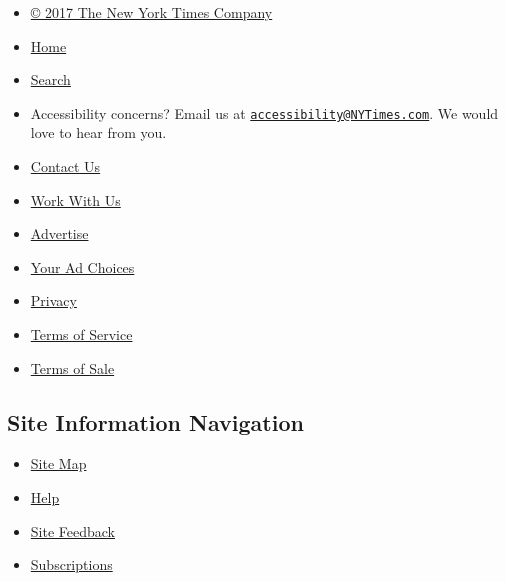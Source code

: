 \begin{itemize}
\tightlist
\item
  \href{https://www.nytimes3xbfgragh.onion/content/help/rights/copyright/copyright-notice.html}{©
  2017 The New York Times Company}
\item
  \href{https://www.nytimes3xbfgragh.onion}{Home}
\item
  \href{https://query.nytimes3xbfgragh.onion/search/sitesearch/\#/}{Search}
\item
  Accessibility concerns? Email us at
  \href{mailto:accessibility@NYTimes.com}{\nolinkurl{accessibility@NYTimes.com}}.
  We would love to hear from you.
\item
  \href{https://www.nytimes3xbfgragh.onion/ref/membercenter/help/infoservdirectory.html}{Contact
  Us}
\item
  \href{http://www.nytco.com/careers}{Work With Us}
\item
  \href{http://nytmediakit.com/}{Advertise}
\item
  \href{https://www.nytimes3xbfgragh.onion/content/help/rights/privacy/policy/privacy-policy.html\#pp}{Your
  Ad Choices}
\item
  \href{https://www.nytimes3xbfgragh.onion/privacy}{Privacy}
\item
  \href{https://www.nytimes3xbfgragh.onion/ref/membercenter/help/agree.html}{Terms
  of Service}
\item
  \href{https://www.nytimes3xbfgragh.onion/content/help/rights/sale/terms-of-sale.html}{Terms
  of Sale}
\end{itemize}

\hypertarget{site-information-navigation-1}{%
\subsection{Site Information
Navigation}\label{site-information-navigation-1}}

\begin{itemize}
\tightlist
\item
  \href{http://spiderbites.nytimes3xbfgragh.onion/}{Site Map}
\item
  \href{https://www.nytimes3xbfgragh.onion/membercenter/sitehelp.html}{Help}
\item
  \href{https://myaccount.nytimes3xbfgragh.onion/membercenter/feedback.html}{Site
  Feedback}
\item
  \href{https://www.nytimes3xbfgragh.onion/subscriptions/Multiproduct/lp5558.html?campaignId=37WXW}{Subscriptions}
\end{itemize}
